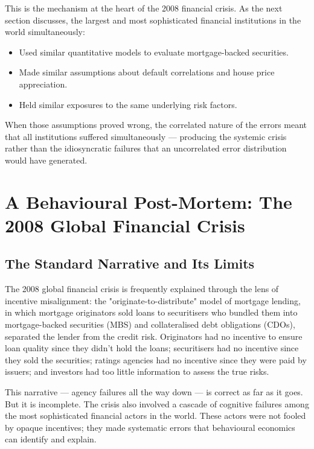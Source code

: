 \documentclass[12pt, letterpaper]{article}
\begin{document}
This is the mechanism at the heart of the 2008 financial crisis. As the next section discusses, the largest and most sophisticated financial institutions in the world simultaneously:
\begin{itemize}
\item Used similar quantitative models to evaluate mortgage-backed securities.
\item Made similar assumptions about default correlations and house price appreciation.
\item Held similar exposures to the same underlying risk factors.
\end{itemize}

When those assumptions proved wrong, the correlated nature of the errors meant that all institutions suffered simultaneously --- producing the systemic crisis rather than the idiosyncratic failures that an uncorrelated error distribution would have generated.

\medskip


\section{A Behavioural Post-Mortem: The 2008 Global Financial Crisis}



\subsection{The Standard Narrative and Its Limits}


The 2008 global financial crisis is frequently explained through the lens of incentive misalignment: the "originate-to-distribute" model of mortgage lending, in which mortgage originators sold loans to securitisers who bundled them into mortgage-backed securities (MBS) and collateralised debt obligations (CDOs), separated the lender from the credit risk. Originators had no incentive to ensure loan quality since they didn't hold the loans; securitisers had no incentive since they sold the securities; ratings agencies had no incentive since they were paid by issuers; and investors had too little information to assess the true risks.

This narrative --- agency failures all the way down --- is correct as far as it goes. But it is incomplete. The crisis also involved a cascade of cognitive failures among the most sophisticated financial actors in the world. These actors were not fooled by opaque incentives; they made systematic errors that behavioural economics can identify and explain.
\end{document}
